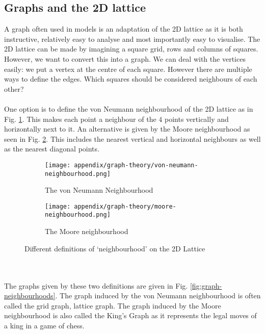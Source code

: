 \subsection{Graphs and the 2D lattice}
A graph often used in models is an adaptation of the 2D lattice as it is both instructive, relatively easy to analyse and most importantly easy to visualise\cite{eq_of_life}. The 2D lattice can be made by imagining a square grid, rows and columns of squares.
However, we want to convert this into a graph. We can deal with the vertices easily: we put a vertex at the centre of each square. However there are multiple ways to define the edges. Which squares should be considered neighbours of each other?\\
\\
One option is to define the von Neumann neighbourhood of the 2D lattice as in Fig. \ref{fig:vonneumann}. This makes each point a neighbour of the $4$ points vertically and horizontally next to it. An alternative is given by the Moore neighbourhood as seen in Fig. \ref{fig:moore}. This includes the nearest vertical and horizontal neighbours as well as the nearest diagonal points\cite{eq_of_life}.
\begin{figure}
	\centering
	\begin{subfigure}{.5\textwidth}
		\centering
		\texttt{[image: appendix/graph-theory/von-neumann-neighbourhood.png]}
		\caption{The von Neumann Neighbourhood}
		\label{fig:vonneumann}
	\end{subfigure}%
	\begin{subfigure}{.5\textwidth}
		\centering
		\texttt{[image: appendix/graph-theory/moore-neighbourhood.png]}
		\caption{The Moore neighbourhood}
		\label{fig:moore}
	\end{subfigure}
	\caption{Different definitions of `neighbourhood' on the 2D Lattice}
	\label{fig: lattice neighbourhoods}
\end{figure}\\
\\
The graphs given by these two definitions are given in Fig. \ref{fig:graph-neighbourhoods}. The graph induced by the von Neumann neighbourhood is often called the grid graph, lattice graph. The graph induced by the Moore neighbourhood is also called the King's Graph as it represents the legal moves of a king in a game of chess.
